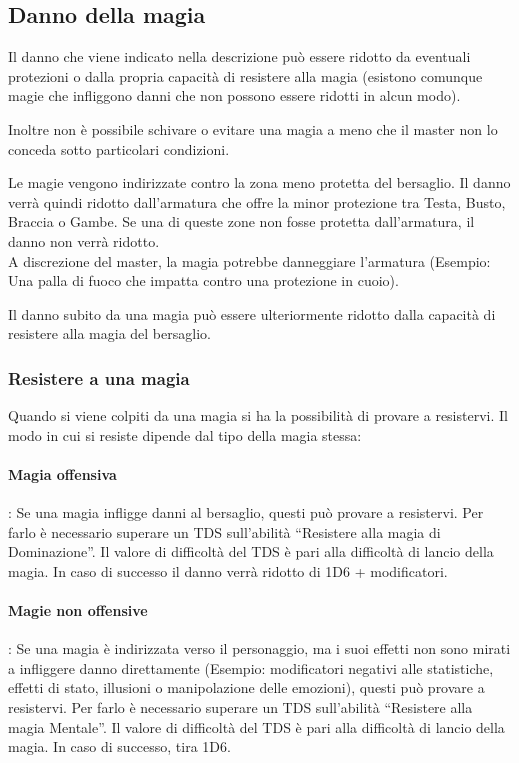 \documentclass[../manuale_main.tex]{subfiles}
\begin{document}
\subsection{Danno della magia}
Il danno che viene indicato nella descrizione può essere ridotto da eventuali protezioni o dalla propria capacità di resistere alla magia (esistono comunque magie che infliggono danni che non possono essere ridotti in alcun modo).

Inoltre non è possibile schivare o evitare una magia a meno che il master non lo conceda sotto particolari condizioni.

Le magie vengono indirizzate contro la zona meno protetta del bersaglio. Il danno verrà quindi ridotto dall'armatura che offre la minor protezione tra Testa, Busto, Braccia o Gambe. Se una di queste zone non fosse protetta dall'armatura, il danno non verrà ridotto.\\
A discrezione del master, la magia potrebbe danneggiare l'armatura (Esempio: Una palla di fuoco che impatta contro una protezione in cuoio).

Il danno subito da una magia può essere ulteriormente ridotto dalla capacità di resistere alla magia del bersaglio.


\subsubsection{Resistere a una magia}
Quando si viene colpiti da una magia si ha la possibilità di provare a resistervi. Il modo in cui si resiste dipende dal tipo della magia stessa:
\paragraph{\textbf{Magia offensiva}}: Se una magia infligge danni al bersaglio, questi può provare a resistervi. Per farlo è necessario superare un TDS sull’abilità “Resistere alla magia di Dominazione”. Il valore di difficoltà del TDS è pari alla difficoltà di lancio della magia. In caso di successo il danno verrà ridotto di 1D6 + modificatori.
\paragraph{\textbf{Magie non offensive}}: Se una magia è indirizzata verso il personaggio, ma i suoi effetti non sono mirati a infliggere danno direttamente (Esempio: modificatori negativi alle statistiche, effetti di stato, illusioni o manipolazione delle emozioni), questi può provare a resistervi. Per farlo è necessario superare un TDS sull’abilità “Resistere alla magia Mentale”. Il valore di difficoltà del TDS è pari alla difficoltà di lancio della magia. In caso di successo, tira 1D6.
\end{document}

